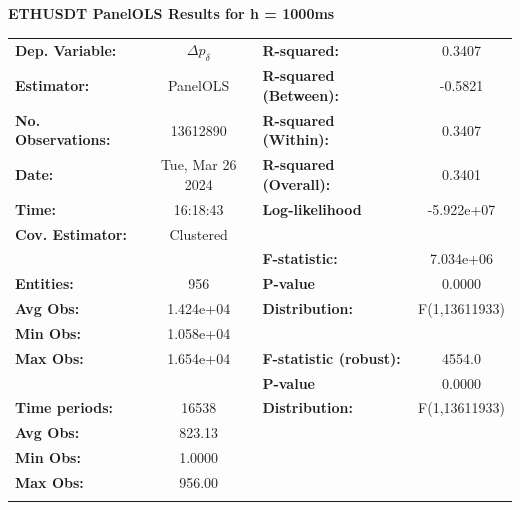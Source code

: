\begin{table}
\textbf{ETHUSDT PanelOLS Results for h = 1000ms}
\begin{center}
\begin{tabular}{lclc}
\hline
\textbf{Dep. Variable:}    &         $\Delta p_{\delta}$         & \textbf{  R-squared:         }   &      0.3407      \\
\textbf{Estimator:}        &      PanelOLS      & \textbf{  R-squared (Between):}  &     -0.5821      \\
\textbf{No. Observations:} &      13612890      & \textbf{  R-squared (Within):}   &      0.3407      \\
\textbf{Date:}             &  Tue, Mar 26 2024  & \textbf{  R-squared (Overall):}  &      0.3401      \\
\textbf{Time:}             &      16:18:43      & \textbf{  Log-likelihood     }   &    -5.922e+07    \\
\textbf{Cov. Estimator:}   &     Clustered      & \textbf{                     }   &                  \\
\textbf{}                  &                    & \textbf{  F-statistic:       }   &    7.034e+06     \\
\textbf{Entities:}         &        956         & \textbf{  P-value            }   &      0.0000      \\
\textbf{Avg Obs:}          &     1.424e+04      & \textbf{  Distribution:      }   &  F(1,13611933)   \\
\textbf{Min Obs:}          &     1.058e+04      & \textbf{                     }   &                  \\
\textbf{Max Obs:}          &     1.654e+04      & \textbf{  F-statistic (robust):} &      4554.0      \\
\textbf{}                  &                    & \textbf{  P-value            }   &      0.0000      \\
\textbf{Time periods:}     &       16538        & \textbf{  Distribution:      }   &  F(1,13611933)   \\
\textbf{Avg Obs:}          &       823.13       & \textbf{                     }   &                  \\
\textbf{Min Obs:}          &       1.0000       & \textbf{                     }   &                  \\
\textbf{Max Obs:}          &       956.00       & \textbf{                     }   &                  \\
\textbf{}                  &                    & \textbf{                     }   &                  \\

\end{tabular}
\end{center}
\end{table}
